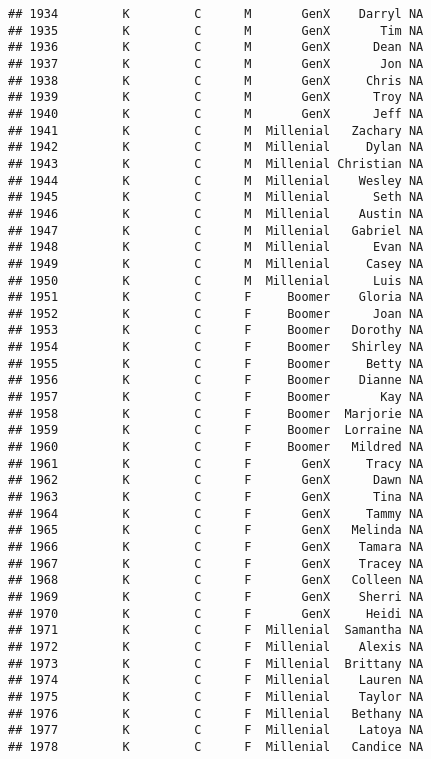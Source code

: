 \documentclass[
]{article}
\begin{document}
\begin{verbatim}
## 1934         K         C      M       GenX    Darryl NA
## 1935         K         C      M       GenX       Tim NA
## 1936         K         C      M       GenX      Dean NA
## 1937         K         C      M       GenX       Jon NA
## 1938         K         C      M       GenX     Chris NA
## 1939         K         C      M       GenX      Troy NA
## 1940         K         C      M       GenX      Jeff NA
## 1941         K         C      M  Millenial   Zachary NA
## 1942         K         C      M  Millenial     Dylan NA
## 1943         K         C      M  Millenial Christian NA
## 1944         K         C      M  Millenial    Wesley NA
## 1945         K         C      M  Millenial      Seth NA
## 1946         K         C      M  Millenial    Austin NA
## 1947         K         C      M  Millenial   Gabriel NA
## 1948         K         C      M  Millenial      Evan NA
## 1949         K         C      M  Millenial     Casey NA
## 1950         K         C      M  Millenial      Luis NA
## 1951         K         C      F     Boomer    Gloria NA
## 1952         K         C      F     Boomer      Joan NA
## 1953         K         C      F     Boomer   Dorothy NA
## 1954         K         C      F     Boomer   Shirley NA
## 1955         K         C      F     Boomer     Betty NA
## 1956         K         C      F     Boomer    Dianne NA
## 1957         K         C      F     Boomer       Kay NA
## 1958         K         C      F     Boomer  Marjorie NA
## 1959         K         C      F     Boomer  Lorraine NA
## 1960         K         C      F     Boomer   Mildred NA
## 1961         K         C      F       GenX     Tracy NA
## 1962         K         C      F       GenX      Dawn NA
## 1963         K         C      F       GenX      Tina NA
## 1964         K         C      F       GenX     Tammy NA
## 1965         K         C      F       GenX   Melinda NA
## 1966         K         C      F       GenX    Tamara NA
## 1967         K         C      F       GenX    Tracey NA
## 1968         K         C      F       GenX   Colleen NA
## 1969         K         C      F       GenX    Sherri NA
## 1970         K         C      F       GenX     Heidi NA
## 1971         K         C      F  Millenial  Samantha NA
## 1972         K         C      F  Millenial    Alexis NA
## 1973         K         C      F  Millenial  Brittany NA
## 1974         K         C      F  Millenial    Lauren NA
## 1975         K         C      F  Millenial    Taylor NA
## 1976         K         C      F  Millenial   Bethany NA
## 1977         K         C      F  Millenial    Latoya NA
## 1978         K         C      F  Millenial   Candice NA

\end{verbatim}
\end{document}
